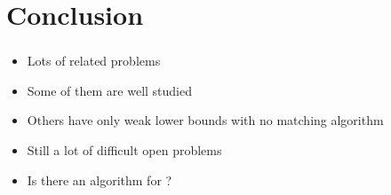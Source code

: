 \section{Conclusion}
\begin{frame}\frametitle{\insertsection}\justifying
{}
\begin{itemize}[label={\color{prussianblue}$\bullet$},itemsep=6pt]
\item Lots of related problems\pause
\item Some of them are well studied\pause
\item Others have only weak lower bounds with no matching algorithm\pause
\item Still a lot of difficult open problems
\end{itemize}\pause
\vspace{0.5cm}
\begin{itemize}[label={\color{prussianblue}$\bullet$},itemsep=6pt]
\item Is there an  algorithm for \threeSUM?
\end{itemize}
\end{frame}
